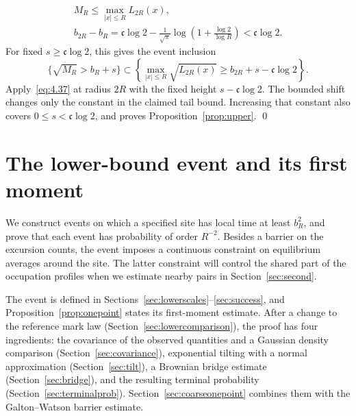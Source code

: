 \documentclass[11pt,letterpaper,reqno]{amsart}
\newif\ifrevmarks \revmarkstrue
\newif\ifshowdeleted \showdeletedfalse
\newcommand{\add}[1]{\ifrevmarks\textcolor{revorange}{#1}\else#1\fi}
\newcommand{\del}[1]{\ifrevmarks\ifshowdeleted{\color{revorange}\footnotesize[\textit{deleted:}~#1]}%
  \else\mbox{\textsuperscript{\textcolor{revorange}{\normalfont\bfseries[del]}}}\fi\fi}
\numberwithin{equation}{section}
\theoremstyle{remark}
\begin{document}
\[
\begin{gathered}
M_R\le\max_{|x|\le R}L_{2R}(x),\\
b_{2R}-b_R
=\mathfrak c\log2-\frac1{\sqrt\pi}
 \log\left(1+\frac{\log2}{\log R}\right)
<\mathfrak c\log2.
\end{gathered}
\]
For fixed $s\ge\mathfrak c\log2$, this gives the event inclusion
\[
\{\sqrt{M_R}>b_R+s\}
\subset
\left\{\max_{|x|\le R}\sqrt{L_{2R}(x)}
\ge b_{2R}+s-\mathfrak c\log2\right\}.
\]
Apply~\eqref{eq:4.37} at radius $2R$ with the fixed height
$s-\mathfrak c\log2$. The bounded shift changes only the constant in the claimed tail bound. Increasing that constant also covers
$0\le s<\mathfrak c\log2$, and proves Proposition~\ref{prop:upper}.
\qed



\section{\texorpdfstring{\del{Proof of Proposition~\ref{prop:onepoint}}\add{The lower-bound event and its first moment}}{The lower-bound event and its first moment}}\label{sec:events}
We construct events on which a specified site has local time at least $b_R^2$, and prove that each event has probability of order $R^{-2}$. Besides a barrier on the excursion counts, the event imposes a continuous constraint on equilibrium averages around the site. The latter constraint will control the shared part of the occupation profiles when we estimate nearby pairs in Section~\ref{sec:second}.

\add{The event is defined in Sections~\ref{sec:lowerscales}--\ref{sec:success}, and Proposition~\ref{prop:onepoint} states its first-moment estimate. After a change to the reference mark law (Section~\ref{sec:lowercomparison}), the proof has four ingredients: the covariance of the observed quantities and a Gaussian density comparison (Section~\ref{sec:covariance}), exponential tilting with a normal approximation (Section~\ref{sec:tilt}), a Brownian bridge estimate (Section~\ref{sec:bridge}), and the resulting terminal probability (Section~\ref{sec:terminalprob}). Section~\ref{sec:coarseonepoint} combines them with the Galton--Watson barrier estimate.}
\end{document}
